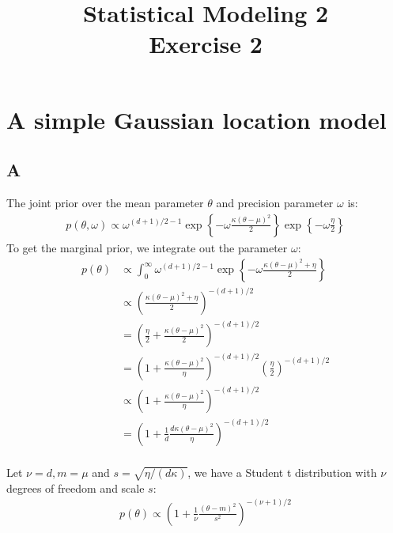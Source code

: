 \documentclass{article}
\title{Statistical Modeling 2 \\ Exercise 2}
\begin{document}
\maketitle
\section{A simple Gaussian location model}
\subsection*{A}
The joint prior over the mean parameter \(\theta\) and precision parameter \(\omega\) is:
\begin{align*}
p(\theta, \omega) \propto \omega^{(d+1)/2-1} \exp \left\lbrace -\omega\frac{\kappa(\theta-\mu)^2}{2}\right\rbrace \exp \left\lbrace -\omega\frac{\eta}{2} \right\rbrace
\end{align*}
To get the marginal prior, we integrate out the parameter \(\omega\):
\begin{align*}
p(\theta) &\propto \int_0^{\infty} \omega^{(d+1)/2-1} \exp \left\lbrace -\omega\frac{\kappa(\theta-\mu)^2 + \eta}{2}\right\rbrace\\
&\propto \left(\frac{\kappa(\theta-\mu)^2 + \eta}{2}\right)^{-(d+1)/2} \\
&= \left(\frac{\eta}{2} + \frac{\kappa(\theta-\mu)^2}{2}\right)^{-(d+1)/2} \\
&= \left(1 + \frac{\kappa(\theta-\mu)^2}{\eta}\right)^{-(d+1)/2} \left(\frac{\eta}{2}\right)^{-(d+1)/2} \\
&\propto \left(1 + \frac{\kappa(\theta-\mu)^2}{\eta}\right)^{-(d+1)/2}\\
&=\left(1 + \frac{1}{d}\frac{d\kappa(\theta-\mu)^2}{\eta}\right)^{-(d+1)/2}\\
\end{align*}

Let \(\nu = d, m = \mu\) and \(s = \sqrt{\eta/(d\kappa)}\), we have a Student t distribution with \(\nu\) degrees of freedom and scale \(s\):
\begin{align*}
p(\theta) \propto \left(1 + \frac{1}{\nu}\frac{(\theta-m)^2}{s^2}\right)^{-(\nu+1)/2}\\
\end{align*}
\end{document}
